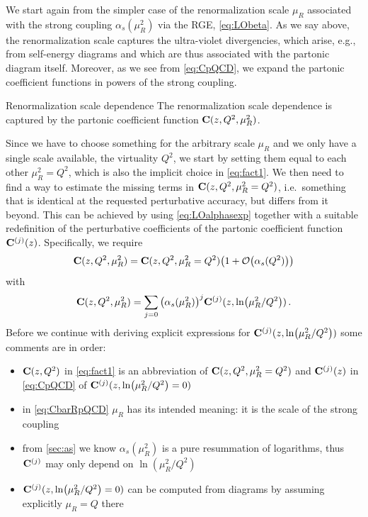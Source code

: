 We start again from the simpler case of the renormalization scale $\mu_R$ associated with the strong coupling $\alpha_s(\mu_R^2)$ via the RGE, \cref{eq:LObeta}.
As we say above, the renormalization scale captures the ultra-violet divergencies, which arise, e.g., from self-energy diagrams and which are thus associated with the partonic diagram itself.
Moreover, as we see from \cref{eq:CpQCD}, we expand the partonic coefficient functions in powers of the strong coupling.
\begin{conclusionbox}{Renormalization scale dependence}
    The renormalization scale dependence is captured by the partonic coefficient function $\vb C(z,Q^2,\mu_R^2)$.
\end{conclusionbox}
Since we have to choose something for the arbitrary scale $\mu_R$ and we only have a single scale available, the virtuality $Q^2$, we start by setting them equal to each other $\mu_R^2 = Q^2$, which is also the implicit choice in \cref{eq:fact1}.
We then need to find a way to estimate the missing terms in $\vb C(z,Q^2,\mu_R^2=Q^2)$, i.e.\ something that is identical at the requested perturbative accuracy, but differs from it beyond.
This can be achieved by using \cref{eq:LOalphasexp} together with a suitable redefinition of the perturbative coefficients of the partonic coefficient function $\vb C^{(j)}(z)$.
Specifically, we require
\begin{equation}
    \vb C(z,Q^2,\mu_R^2) = \vb C(z,Q^2,\mu_R^2=Q^2)\qty(1 + \order{\alpha_s(Q^2)})
\end{equation}
with
\begin{equation}
    \vb C(z,Q^2,\mu_R^2) = \sum_{j=0} \qty(\alpha_s(\mu_R^2))^j \vb C^{(j)}(z,\ln(\mu_R^2/Q^2)) \,. \label{eq:CbarRpQCD}
\end{equation}
Before we continue with deriving explicit expressions for $\vb C^{(j)}(z,\ln(\mu_R^2/Q^2))$ some comments are in order:
\begin{itemize}
    \item $\vb C(z,Q^2)$ in \cref{eq:fact1} is an abbreviation of $\vb C(z,Q^2,\mu_R^2=Q^2)$ and $\vb C^{(j)}(z)$ in \cref{eq:CpQCD} of $\vb C^{(j)}(z,\ln(\mu_R^2/Q^2)=0)$
    \item in \cref{eq:CbarRpQCD} $\mu_R$ has its intended meaning: it is the scale of the strong coupling
    \item from \cref{sec:as} we know $\alpha_s(\mu_R^2)$ is a pure resummation of logarithms, thus $\vb C^{(j)}$ may only depend on $\ln(\mu_R^2/Q^2)$
    \item $\vb C^{(j)}(z,\ln(\mu_R^2/Q^2)=0)$ can be computed from diagrams by assuming explicitly $\mu_R = Q$ there
\end{itemize}

